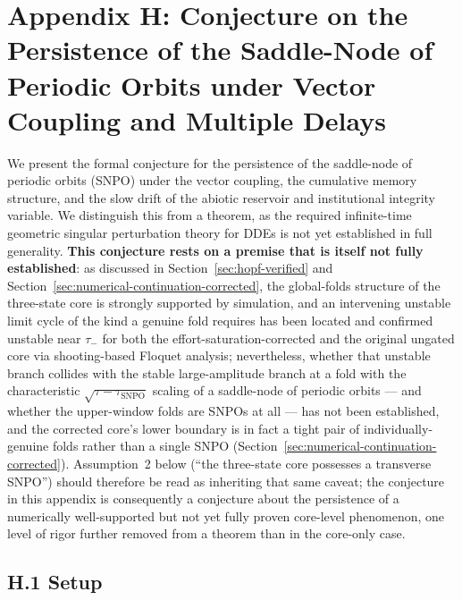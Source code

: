 \documentclass[twocolumn,10pt]{article}
\begin{document}
\section{Appendix H: Conjecture on the Persistence of the Saddle-Node of Periodic Orbits under Vector Coupling and Multiple Delays}
We present the formal conjecture for the persistence of the saddle-node of periodic orbits (SNPO) under the vector coupling, the cumulative memory structure, and the slow drift of the abiotic reservoir and institutional integrity variable. We distinguish this from a theorem, as the required infinite-time geometric singular perturbation theory for DDEs is not yet established in full generality. \textbf{This conjecture rests on a premise that is itself not fully established}: as discussed in Section~\ref{sec:hopf-verified} and Section~\ref{sec:numerical-continuation-corrected}, the global-folds structure of the three-state core is strongly supported by simulation, and an intervening unstable limit cycle of the kind a genuine fold requires has been located and confirmed unstable near $\tau_-$ for both the effort-saturation-corrected and the original ungated core via shooting-based Floquet analysis; nevertheless, whether that unstable branch collides with the stable large-amplitude branch at a fold with the characteristic $\sqrt{\tau-\tau_{\text{SNPO}}}$ scaling of a saddle-node of periodic orbits --- and whether the upper-window folds are SNPOs at all --- has not been established, and the corrected core's lower boundary is in fact a tight pair of individually-genuine folds rather than a single SNPO (Section~\ref{sec:numerical-continuation-corrected}). Assumption~2 below (``the three-state core possesses a transverse SNPO'') should therefore be read as inheriting that same caveat; the conjecture in this appendix is consequently a conjecture about the persistence of a numerically well-supported but not yet fully proven core-level phenomenon, one level of rigor further removed from a theorem than in the core-only case.

\subsection{H.1 Setup}
\end{document}
